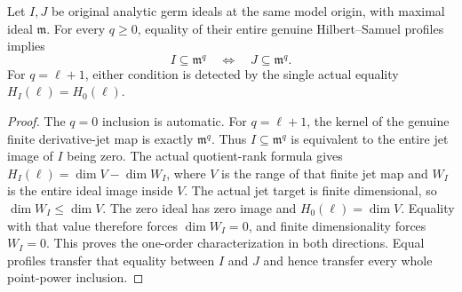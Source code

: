 \begin{theorem}
\label{hir:actual-hs-profile-point-power-detection}
\leanok
Let $I,J$ be original analytic germ ideals at the same model origin, with maximal ideal $\mathfrak m$. For every $q\ge0$, equality of their entire genuine Hilbert--Samuel profiles implies
\[
 I\subseteq\mathfrak m^q\quad\Longleftrightarrow\quad J\subseteq\mathfrak m^q.
\]
For $q=\ell+1$, either condition is detected by the single actual equality $H_I(\ell)=H_0(\ell)$.
\end{theorem}
\begin{proof}
The $q=0$ inclusion is automatic. For $q=\ell+1$, the kernel of the genuine finite derivative-jet map is exactly $\mathfrak m^q$. Thus $I\subseteq\mathfrak m^q$ is equivalent to the entire jet image of $I$ being zero. The actual quotient-rank formula gives $H_I(\ell)=\dim V-\dim W_I$, where $V$ is the range of that finite jet map and $W_I$ is the entire ideal image inside $V$. The actual jet target is finite dimensional, so $\dim W_I\le\dim V$. The zero ideal has zero image and $H_0(\ell)=\dim V$. Equality with that value therefore forces $\dim W_I=0$, and finite dimensionality forces $W_I=0$. This proves the one-order characterization in both directions. Equal profiles transfer that equality between $I$ and $J$ and hence transfer every whole point-power inclusion.
\end{proof}

